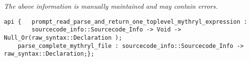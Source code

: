 \label{api:Parse\_Mythryl}

{\tiny \it The above information is manually maintained and may contain errors.}
\begin{verbatim}
api {   prompt_read_parse_and_return_one_toplevel_mythryl_expression :
        sourcecode_info::Sourcecode_Info -> Void -> Null_Or(raw_syntax::Declaration );
    parse_complete_mythryl_file : sourcecode_info::Sourcecode_Info -> raw_syntax::Declaration;};
\end{verbatim}
